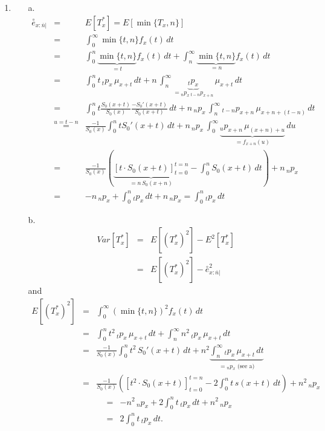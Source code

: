 \documentclass[11pt,fleqn,oneside]{book}
\begin{document}
\begin{enumerate}
\item
\begin{itemize}
\item[a.]
\begin{eqnarray*}
\stackrel{\circ}{e}_{x:\overline{n}|} &=& E[T^*_x] = E[\min\{T_x,n\}] \\
&=& \int_0^{\infty} \min\{t,n\} f_{x}(t)\,dt \\
&=& \int_0^n \underbrace{\min\{t,n\}}_{=t} f_{x}(t)\,dt + \int_n^{\infty} \underbrace{\min\{t,n\}}_{=n} f_{x}(t)\,dt \\
&=& \int_{0}^n t\,{_tp_x}\,\mu_{x+t}\,dt + n\,\int_{n}^\infty \underbrace{{_tp_x}}_{={_np_x}\,{_{t-n}p_{x+n}}}\,\mu_{x+t}\,dt \\
&=& \int_0^n t \frac{S_0(x+t)}{S_0(x)} \frac{-S_0'(x+t)}{S_0(x+t)}\,dt + n\,{_np_x}\,\int_{n}^\infty {_{t-n}p_{x+n}}\,\mu_{x+n+(t-n)}\,dt \\
&\stackrel{u=t-n}{=}& \frac{-1}{S_0(x)}\int_0^n t S_0'(x+t)\,dt + n\,{_np_x}\,\int_{0}^\infty \underbrace{{_{u}p_{x+n}}\,\mu_{(x+n)+u}}_{=f_{x+n}(u)}\,du\\
&=& \frac{-1}{S_0(x)}\left(\underbrace{\left[t\cdot S_0(x+t)\right]_{t=0}^{t=n}}_{=n\,S_0(x+n)} - \int_0^n S_0(x+t)\,dt \right)
+ n\,{_np_x}\\
&=& - n\,{_np_x} + \int_0^n {_tp_x}\,dt + n\,{_np_x} = \int_0^n {_tp_x}\,dt
\end{eqnarray*}
\item[b.]
\begin{eqnarray*}
Var[T^*_x] &=& E[(T^*_x)^2] - E^2[T^*_x] \\
&=& E[(T^*_x)^2] - \stackrel{\circ}{e}^2_{x:\overline{n}|}
\end{eqnarray*}
and
\begin{eqnarray*}
E[(T^*_x)^2] &=& \int_0^{\infty} \left(\min\{t,n\}\right)^2 f_{x}(t)\,dt\\
&=& \int_0^n t^2\, {_tp_x}\, \mu_{x+t}\,dt + \int_n^{\infty} n^2 \,{_tp_x}\, \mu_{x+t}\,dt\\
&=& \frac{-1}{S_0(x)} \int_0^n t^2\,S_0'(x+t)\,dt + n^2 \underbrace{\int_n^\infty {_tp_x}\, \mu_{x+t}\,dt}_{={_np_x} \text{ (see a)}} \\
&=& \frac{-1}{S_0(x)} \left(\left[t^2\cdot S_0(x+t)\right]_{t=0}^{t=n} - 2\int_0^n t\,s(x+t)\,dt \right)+ n^2 \,{_np_x}
\end{eqnarray*}
\begin{eqnarray*}
&=& - n^2 \,{_np_x} + 2\int_0^n t\,{_tp_x}\,dt + n^2 \,{_np_x}\\
&=& 2\int_0^n t\,{_tp_x}\,dt.
\end{eqnarray*}
\end{itemize}

\end{enumerate}
\normalsize
\end{document}
